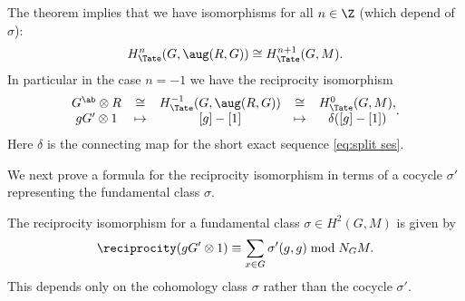 \begin{definition} \label{def:reciprocity iso}
	The theorem implies that we have isomorphisms for all $n\in \Z$ (which depend of $\sigma$):
	\[
		H^{n}_{\Tate}(G,\aug(R,G)) \cong H^{n+1}_{\Tate}(G,M) .
	\]
	In particular in the case $n = -1$ we have the reciprocity isomorphism
	\[
		\begin{matrix}
			G^{\ab} \otimes R & \cong & H^{-1}_{\Tate}(G,\aug(R,G)) &\cong&  H^0_{\Tate}(G,M), \\
			gG' \otimes 1 & \mapsto & [g] - [1] & \mapsto & \delta ([g] - [1])
		\end{matrix}.
	\]
	Here $\delta$ is the connecting map for the short exact sequence \ref{eq:split ses}.
\end{definition}

We next prove a formula for the reciprocity isomorphism in terms of
a cocycle $\sigma'$ representing the fundamental class $\sigma$.

\begin{lemma} \label{lem:reciprocity formula}
	The reciprocity isomorphism for a fundamental class $\sigma \in H^2(G,M)$ is given by
	\[
		\reciprocity(gG' \otimes 1) \equiv  \sum_{x \in G} \sigma'(g,g) \bmod N_G M.
	\]
	This depends only on the cohomology class $\sigma$ rather than the cocycle $\sigma'$.
\end{lemma}

